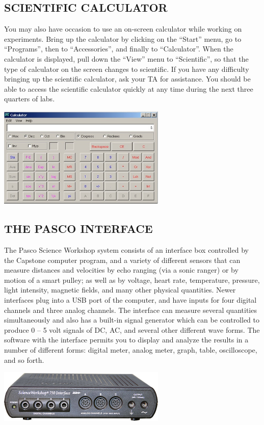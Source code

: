\subsection*{SCIENTIFIC CALCULATOR}

You may also have occasion to use an on-screen calculator while working on experiments.  Bring up the calculator by clicking on the ``Start'' menu, go to ``Programs'', then to ``Accessories'', and finally to ``Calculator''.  When the calculator is displayed, pull down the ``View'' menu to ``Scientific'', so that the type of calculator on the screen changes to scientific.  If you have any difficulty bringing up the scientific calculator, ask your TA for assistance.  You should be able to access the scientific calculator quickly at any time during the next three quarters of labs.
\begin{center} \includegraphics*[width=0.6\textwidth]{imgs/6labs/6Alab/6Aexp1/6A-Exp1_fig1.jpg} \end{center}

\subsection*{THE PASCO INTERFACE}

The Pasco Science Workshop system consists of an interface box controlled by the Capstone computer program, and a variety of different sensors that can measure distances and velocities by echo ranging (via a sonic ranger) or by motion of a smart pulley; as well as by voltage, heart rate, temperature, pressure, light intensity, magnetic fields, and many other physical quantities.  Newer interfaces plug into a USB port of the computer, and have inputs for four digital channels and three analog channels.  The interface can measure several quantities simultaneously and also has a built-in signal generator which can be controlled to produce 0 -- 5 volt signals of DC, AC, and several other different wave forms.  The software with the interface permits you to display and analyze the results in a number of different forms: digital meter, analog meter, graph, table, oscilloscope, and so forth.
\begin{center} \includegraphics*[width=0.6\textwidth]{imgs/6labs/6Alab/6Aexp1/6a_exp1_sensorbcak.jpg} \end{center}

